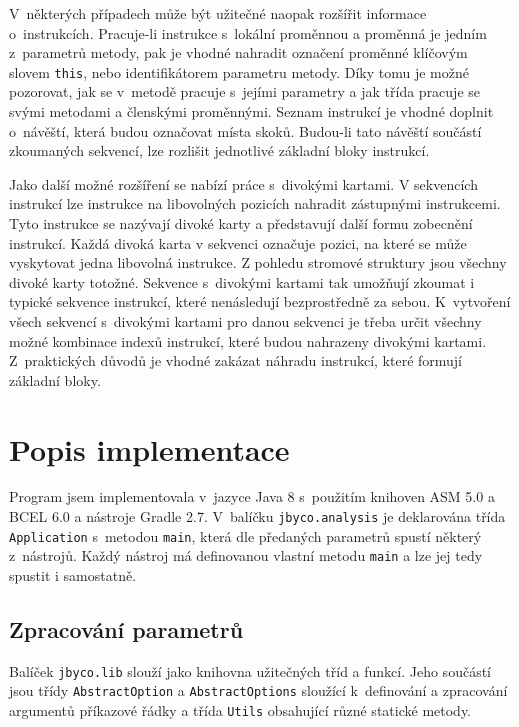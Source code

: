 V~některých případech může být užitečné naopak rozšířit informace o~instrukcích. Pracuje-li instrukce s~lokální proměnnou a proměnná je jedním z~parametrů metody, pak je vhodné nahradit označení proměnné klíčovým slovem \texttt{this}, nebo identifikátorem parametru metody. Díky tomu je možné pozorovat, jak se v~metodě pracuje s~jejími parametry a jak třída pracuje se svými metodami a členskými proměnnými.
Seznam instrukcí je vhodné doplnit o~návěští, která budou označovat místa skoků. Budou-li tato návěští součástí zkoumaných sekvencí, lze rozlišit jednotlivé základní bloky instrukcí.

Jako další možné rozšíření se nabízí práce s~divokými kartami.
V sekvencích instrukcí lze instrukce na libovolných pozicích nahradit zástupnými instrukcemi.
Tyto instrukce se nazývají divoké karty a představují další formu zobecnění instrukcí. Každá divoká karta v sekvenci označuje pozici, na které se může vyskytovat jedna libovolná instrukce. Z pohledu stromové struktury jsou všechny divoké karty totožné.
 Sekvence s~divokými kartami tak umožňují zkoumat i typické sekvence instrukcí, které nenásledují bezprostředně za sebou. K~vytvoření všech sekvencí s~divokými kartami pro danou sekvenci je třeba určit všechny možné kombinace indexů instrukcí, které budou nahrazeny divokými kartami. Z~praktických důvodů je vhodné zakázat náhradu instrukcí, které formují základní bloky.

\section{Popis implementace}\label{ToolImplementation}

Program jsem implementovala v~jazyce Java 8 s~použitím knihoven ASM 5.0 a BCEL 6.0 a nástroje Gradle 2.7. V~balíčku \texttt{jbyco.analysis} je deklarována třída \texttt{Application} s~metodou \texttt{main}, která dle předaných parametrů spustí některý z~nástrojů. Každý nástroj má definovanou vlastní metodu \texttt{main} a lze jej tedy spustit i samostatně.

\subsection{Zpracování parametrů}

Balíček \texttt{jbyco.lib} slouží jako knihovna užitečných tříd a funkcí. Jeho součástí jsou třídy \texttt{AbstractOption} a \texttt{AbstractOptions} sloužící k~definování a zpracování argumentů příkazové řádky a třída \texttt{Utils} obsahující různé statické metody. 

